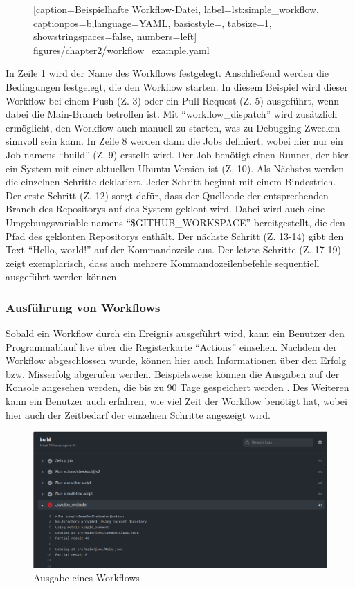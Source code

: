 \begin{figure}[ht!]
	
			[caption={Beispielhafte Workflow-Datei},
			label={lst:simple_workflow},
			captionpos=b,language=YAML, basicstyle=\footnotesize, tabsize=1, showstringspaces=false,  numbers=left]
			{figures/chapter2/workflow_example.yaml}
			\end{figure}
In Zeile 1 wird der Name des Workflows festgelegt. Anschließend werden die Bedingungen festgelegt, die den Workflow starten. In diesem Beispiel wird dieser Workflow bei einem Push (Z. 3) oder ein Pull-Request (Z. 5) ausgeführt, wenn dabei die Main-Branch betroffen ist. Mit \enquote{workflow\_dispatch} wird zusätzlich ermöglicht, den Workflow auch manuell zu starten, was zu Debugging-Zwecken sinnvoll sein kann. In Zeile 8 werden dann die Jobs definiert, wobei hier nur ein Job namens \enquote{build} (Z. 9) erstellt wird. Der Job benötigt einen Runner, der hier ein System mit einer aktuellen Ubuntu-Version ist (Z. 10). Als Nächstes werden die einzelnen Schritte deklariert. Jeder Schritt beginnt mit einem Bindestrich. Der erste Schritt (Z. 12) sorgt dafür, dass der Quellcode der entsprechenden Branch des Repositorys auf das System geklont wird. Dabei wird auch eine Umgebungsvariable namens \enquote{\$GITHUB\_WORKSPACE} bereitgestellt, die den Pfad des geklonten Repositorys enthält. Der nächste Schritt (Z. 13-14) gibt den Text \enquote{Hello, world!} auf der Kommandozeile aus. Der letzte Schritte (Z. 17-19) zeigt exemplarisch, dass auch mehrere Kommandozeilenbefehle sequentiell ausgeführt  werden können.

\subsubsection{Ausführung von Workflows}
Sobald ein Workflow durch ein Ereignis ausgeführt wird, kann ein Benutzer den Programmablauf live über die Registerkarte \enquote{Actions} einsehen. Nachdem der Workflow abgeschlossen wurde, können hier auch Informationen über den Erfolg bzw. Misserfolg abgerufen werden. Beispielsweise können die Ausgaben auf der Konsole angesehen werden, die bis zu 90 Tage gespeichert werden \cite[S.~53]{github_action_book}.  Des Weiteren kann ein Benutzer auch erfahren, wie viel Zeit der Workflow benötigt hat, wobei hier auch der Zeitbedarf der einzelnen Schritte angezeigt wird. 

\begin{figure}[ht!]
    \centering
    \includegraphics[width=0.9\columnwidth]{figures/chapter2/workflow_output.png}
    \caption{Ausgabe eines Workflows}
    \label{fig:workflow_output}
\end{figure}

